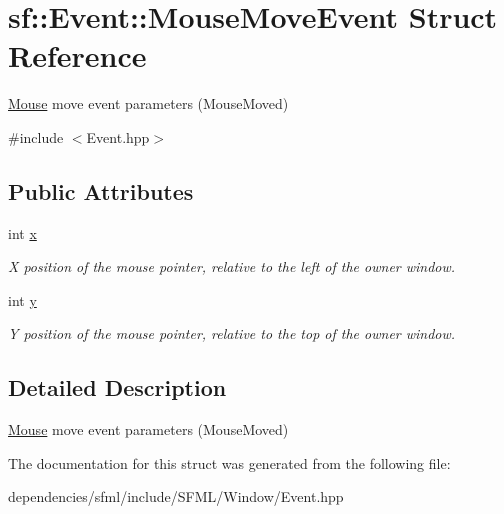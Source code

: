 \hypertarget{structsf_1_1_event_1_1_mouse_move_event}{}\section{sf\+:\+:Event\+:\+:Mouse\+Move\+Event Struct Reference}
\label{structsf_1_1_event_1_1_mouse_move_event}


\hyperlink{classsf_1_1_mouse}{Mouse} move event parameters (Mouse\+Moved)  




{\ttfamily \#include $<$Event.\+hpp$>$}

\subsection*{Public Attributes}
\begin{DoxyCompactItemize}
\item 
\mbox{\label{structsf_1_1_event_1_1_mouse_move_event_aa3a23809afb905cbb52c66d8512e21fd}} 
int \hyperlink{structsf_1_1_event_1_1_mouse_move_event_aa3a23809afb905cbb52c66d8512e21fd}{x}
\begin{DoxyCompactList}\small\item\em X position of the mouse pointer, relative to the left of the owner window. \end{DoxyCompactList}\item 
\mbox{\label{structsf_1_1_event_1_1_mouse_move_event_a86d78a2fba5b3abda16ca059f2392ad4}} 
int \hyperlink{structsf_1_1_event_1_1_mouse_move_event_a86d78a2fba5b3abda16ca059f2392ad4}{y}
\begin{DoxyCompactList}\small\item\em Y position of the mouse pointer, relative to the top of the owner window. \end{DoxyCompactList}\end{DoxyCompactItemize}


\subsection{Detailed Description}
\hyperlink{classsf_1_1_mouse}{Mouse} move event parameters (Mouse\+Moved) 

The documentation for this struct was generated from the following file\+:\begin{DoxyCompactItemize}
\item 
dependencies/sfml/include/\+S\+F\+M\+L/\+Window/Event.\+hpp\end{DoxyCompactItemize}
